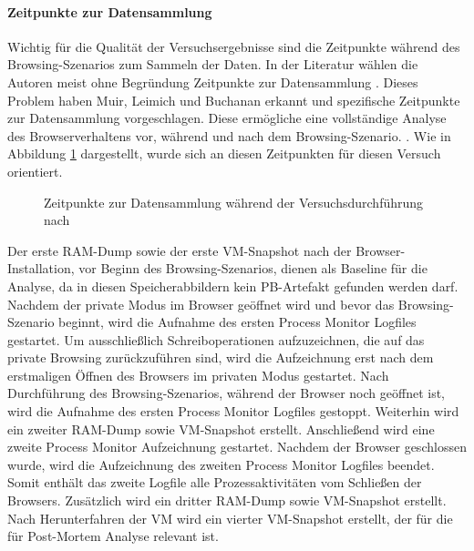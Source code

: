 \paragraph*{Zeitpunkte zur Datensammlung}
Wichtig für die Qualität der Versuchsergebnisse sind die Zeitpunkte während des Browsing-Szenarios zum Sammeln der Daten.
In der Literatur wählen die Autoren meist ohne Begründung Zeitpunkte zur Datensammlung \cite{Sajan.2021, Nalawade.2016, Montasari.2015, Satvat.2014, Said.2011, Aggarwal.2010}.
Dieses Problem haben Muir, Leimich und Buchanan erkannt und spezifische Zeitpunkte zur Datensammlung vorgeschlagen. Diese ermögliche eine vollständige Analyse des Browserverhaltens vor, während und nach dem Browsing-Szenario. \cite{Muir.2019}. Wie in Abbildung \ref{img:zeitpunkte-datensammlung} dargestellt, wurde sich an diesen Zeitpunkten für diesen Versuch orientiert.
\begin{figure}[h!]
	\centering
	\small
	\centerline{\resizebox{\linewidth}{!}{}}
	\caption{Zeitpunkte zur Datensammlung während der Versuchsdurchführung nach \cite{Muir.2019}}
	\label{img:zeitpunkte-datensammlung}
\end{figure}

Der erste RAM-Dump sowie der erste VM-Snapshot nach der Browser-Installation, vor Beginn des Browsing-Szenarios, dienen als Baseline für die Analyse, da in diesen Speicherabbildern kein PB-Artefakt gefunden werden darf.
Nachdem der private Modus im Browser geöffnet wird und bevor das Browsing-Szenario beginnt, wird die Aufnahme des ersten Process Monitor Logfiles gestartet. Um ausschließlich Schreiboperationen aufzuzeichnen, die auf das private Browsing zurückzuführen sind, wird die Aufzeichnung erst nach dem erstmaligen Öffnen des Browsers im privaten Modus gestartet.
Nach Durchführung des Browsing-Szenarios, während der Browser noch geöffnet ist, wird die Aufnahme des ersten Process Monitor Logfiles gestoppt. Weiterhin wird ein zweiter RAM-Dump sowie VM-Snapshot erstellt. Anschließend wird eine zweite Process Monitor Aufzeichnung gestartet. 
Nachdem der Browser geschlossen wurde, wird die Aufzeichnung des zweiten Process Monitor Logfiles beendet. Somit enthält das zweite Logfile alle Prozessaktivitäten vom Schließen der Browsers. Zusätzlich wird ein dritter RAM-Dump sowie  VM-Snapshot erstellt. 
Nach Herunterfahren der VM wird ein vierter VM-Snapshot erstellt, der für die für Post-Mortem Analyse relevant ist.

